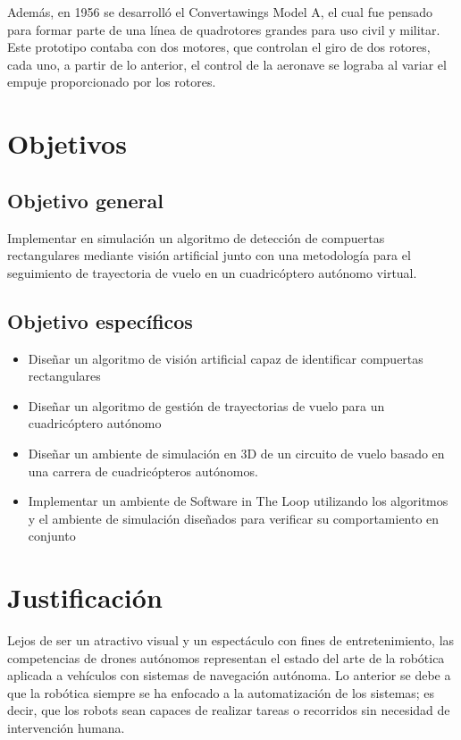 Además, en 1956 se desarrolló el Convertawings Model A, el cual fue pensado para formar parte de una línea de quadrotores grandes para uso civil y militar. Este prototipo contaba con dos motores, que controlan el giro de dos rotores, cada uno, a partir de lo anterior, el control de la aeronave se lograba al variar el empuje proporcionado por los rotores.





\section{Objetivos}
\subsection{Objetivo general}

Implementar en simulación un algoritmo de detección de compuertas rectangulares mediante visión artificial junto con una metodología para el seguimiento de trayectoria de vuelo en un cuadricóptero autónomo virtual.

\subsection{Objetivo específicos}

\begin{itemize}
    \item Diseñar un algoritmo de visión artificial capaz de identificar compuertas rectangulares 
    \item Diseñar un algoritmo de gestión de trayectorias de vuelo para un cuadricóptero autónomo 
    \item Diseñar un ambiente de simulación en 3D de un circuito de vuelo basado en una carrera de cuadricópteros autónomos. 
    \item Implementar un ambiente de Software in The Loop utilizando los algoritmos y el ambiente de simulación diseñados para verificar su comportamiento en conjunto 
\end{itemize}

\section{Justificación}
Lejos de ser un atractivo visual y un espectáculo con fines de entretenimiento, las competencias de drones autónomos representan el estado del arte de la robótica aplicada a vehículos con sistemas de navegación autónoma.
Lo anterior se debe a que la robótica siempre se ha enfocado a la automatización de los sistemas; es decir, que los robots sean capaces de realizar tareas o recorridos sin necesidad de intervención humana. 

